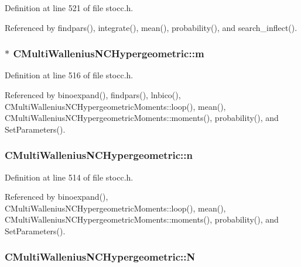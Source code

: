 Definition at line 521 of file stocc.\-h.



Referenced by findpars(), integrate(), mean(), probability(), and search\-\_\-inflect().

\subsubsection[{m}]{ $\ast$ C\-Multi\-Wallenius\-N\-C\-Hypergeometric\-::m\hspace{0.3cm}{\ttfamily [protected]}}\label{class_c_multi_wallenius_n_c_hypergeometric_a78c8051ed91acf9ae1cdc1048753e103}


Definition at line 516 of file stocc.\-h.



Referenced by binoexpand(), findpars(), lnbico(), C\-Multi\-Wallenius\-N\-C\-Hypergeometric\-Moments\-::loop(), mean(), C\-Multi\-Wallenius\-N\-C\-Hypergeometric\-Moments\-::moments(), probability(), and Set\-Parameters().

\subsubsection[{n}]{ C\-Multi\-Wallenius\-N\-C\-Hypergeometric\-::n\hspace{0.3cm}{\ttfamily [protected]}}\label{class_c_multi_wallenius_n_c_hypergeometric_ab2e3ead6b41283fd5c646e4178a71f19}


Definition at line 514 of file stocc.\-h.



Referenced by binoexpand(), C\-Multi\-Wallenius\-N\-C\-Hypergeometric\-Moments\-::loop(), mean(), C\-Multi\-Wallenius\-N\-C\-Hypergeometric\-Moments\-::moments(), probability(), and Set\-Parameters().

\subsubsection[{N}]{ C\-Multi\-Wallenius\-N\-C\-Hypergeometric\-::\-N\hspace{0.3cm}{\ttfamily [protected]}}\label{class_c_multi_wallenius_n_c_hypergeometric_a036036e438e88d87527133ca35d163e3}


